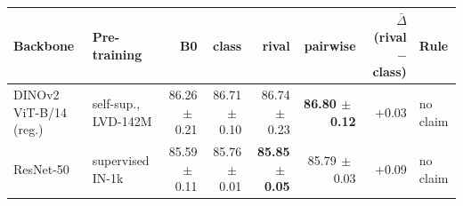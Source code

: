 \begin{tabular}{llrrrrrl}
\toprule
Backbone & Pre-training & B0 & class & rival & pairwise & $\bar\Delta$ (rival$-$class) & Rule \\
\midrule
DINOv2 ViT-B/14 (reg.) & self-sup., LVD-142M & 86.26{\scriptsize$\,\pm\,$0.21} & 86.71{\scriptsize$\,\pm\,$0.10} & 86.74{\scriptsize$\,\pm\,$0.23} & \textbf{86.80{\scriptsize$\,\pm\,$0.12}} & +0.03 & no claim \\
ResNet-50 & supervised IN-1k & 85.59{\scriptsize$\,\pm\,$0.11} & 85.76{\scriptsize$\,\pm\,$0.01} & \textbf{85.85{\scriptsize$\,\pm\,$0.05}} & 85.79{\scriptsize$\,\pm\,$0.03} & +0.09 & no claim \\
\bottomrule
\end{tabular}
